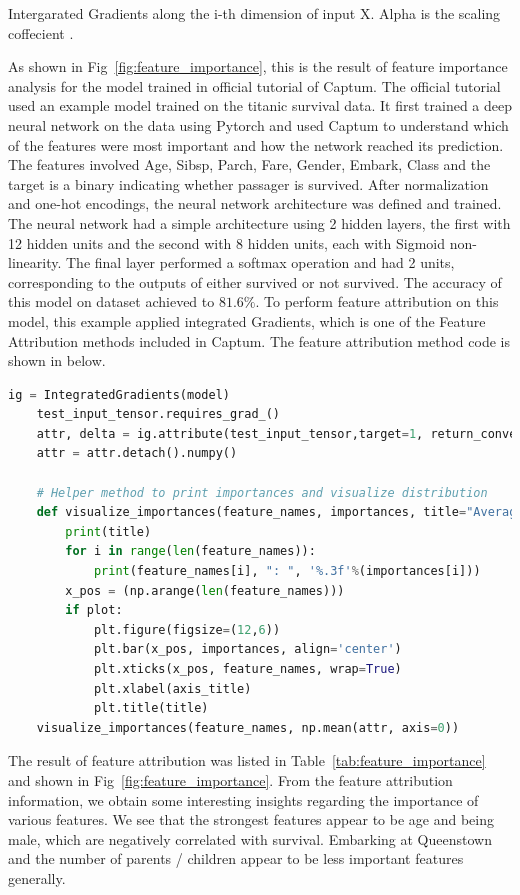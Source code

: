 \documentclass[final-report]{report-template}
\begin{document}
Intergarated Gradients along the i-th dimension of input X. Alpha is the scaling coffecient \citep{sundararajan2017axiomatic}.

As shown in Fig~\ref{fig:feature_importance}, this is the result of feature importance analysis for the model trained in official tutorial of Captum.
The official tutorial used an example model trained on the titanic survival data. 
It first trained a deep neural network on the data using Pytorch and used Captum to understand which of the features were most important and how the network reached its prediction.
The features involved Age, Sibsp, Parch, Fare, Gender, Embark, Class and the target is a binary indicating whether passager is survived. After normalization and one-hot encodings, the neural network architecture was defined and trained. 
The neural network had a simple architecture using 2 hidden layers, the first with 12 hidden units and the second with 8 hidden units, each with Sigmoid non-linearity.
The final layer performed a softmax operation and had 2 units, corresponding to the outputs of either survived or not survived. The accuracy of this model on dataset achieved to $81.6\%$. To perform feature attribution on this model, this example applied integrated Gradients, which is one of the Feature Attribution methods included in Captum. The feature attribution method code is shown in below.

\begin{lstlisting}[language=Python]
    ig = IntegratedGradients(model)
    test_input_tensor.requires_grad_()
    attr, delta = ig.attribute(test_input_tensor,target=1, return_convergence_delta=True)
    attr = attr.detach().numpy()

    # Helper method to print importances and visualize distribution
    def visualize_importances(feature_names, importances, title="Average Feature Importances", plot=True, axis_title="Features"):
        print(title)
        for i in range(len(feature_names)):
            print(feature_names[i], ": ", '%.3f'%(importances[i]))
        x_pos = (np.arange(len(feature_names)))
        if plot:
            plt.figure(figsize=(12,6))
            plt.bar(x_pos, importances, align='center')
            plt.xticks(x_pos, feature_names, wrap=True)
            plt.xlabel(axis_title)
            plt.title(title)
    visualize_importances(feature_names, np.mean(attr, axis=0))
\end{lstlisting}

The result of feature attribution was listed in Table~\ref{tab:feature_importance} and shown in Fig~\ref{fig:feature_importance}.
From the feature attribution information, we obtain some interesting insights regarding the importance of various features. We see that the strongest features appear to be age and being male, which are negatively correlated with survival. Embarking at Queenstown and the number of parents / children appear to be less important features generally.
\end{document}
